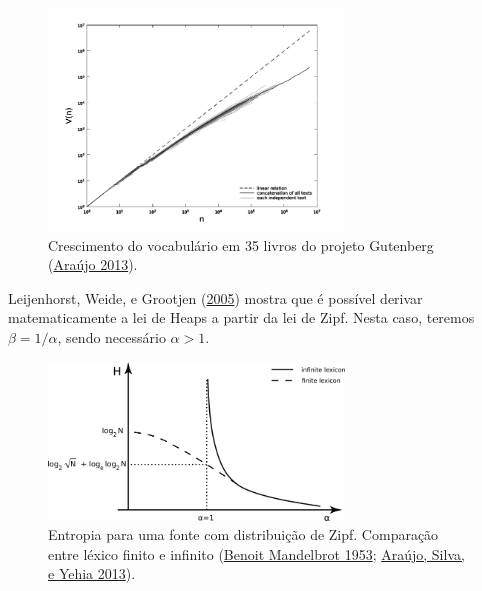 \documentclass[
  ignorenonframetext,
  aspectratio=169]{beamer}
\begin{document}
\begin{frame}
\begin{figure}
\centering
\includegraphics[width=0.7\textwidth,height=\textheight]{heaps.png}
\caption{Crescimento do vocabulário em 35 livros do projeto Gutenberg
(\protect\hyperlink{ref-leoca2013}{Araújo 2013}).}
\end{figure}
\end{frame}

\begin{frame}
Leijenhorst, Weide, e Grootjen
(\protect\hyperlink{ref-vanLeijenhorst2005}{2005}) mostra que é possível
derivar matematicamente a lei de Heaps a partir da lei de Zipf. Nesta
caso, teremos \(\beta = 1/\alpha\), sendo necessário \(\alpha > 1\).
\end{frame}

\begin{frame}
\begin{figure}
\centering
\includegraphics[width=0.7\textwidth,height=\textheight]{entropy_zipf.png}
\caption{Entropia para uma fonte com distribuição de Zipf. Comparação
entre léxico finito e infinito
(\protect\hyperlink{ref-mandelbrot1953theorie}{Benoit Mandelbrot 1953};
\protect\hyperlink{ref-leoca2013glotto}{Araújo, Silva, e Yehia 2013}).}
\end{figure}
\end{frame}
\end{document}
